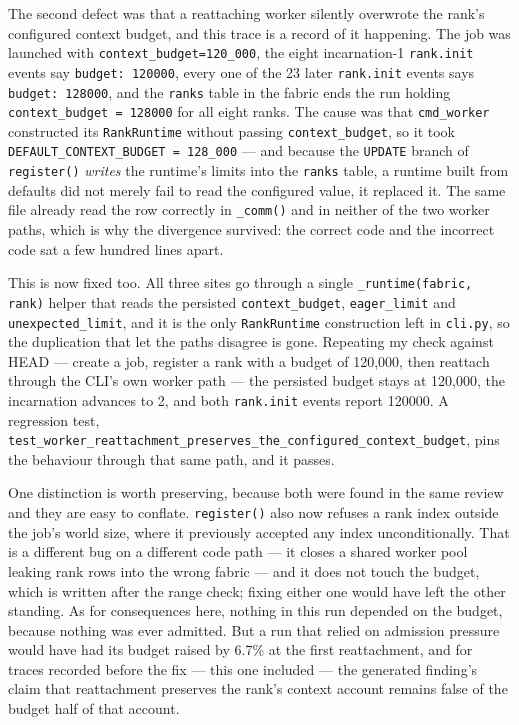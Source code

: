\documentclass[11pt]{article}
\begin{document}
The second defect was that a reattaching worker silently overwrote the rank's configured context
budget, and this trace is a record of it happening. The job was launched with
\texttt{context\_budget=120\_000}, the eight incarnation-1 \texttt{rank.init} events say
\texttt{budget: 120000}, every one of the 23 later \texttt{rank.init} events says
\texttt{budget: 128000}, and the \texttt{ranks} table in the fabric ends the run holding
\texttt{context\_budget = 128000} for all eight ranks. The cause was that \texttt{cmd\_worker}
constructed its \texttt{RankRuntime} without passing \texttt{context\_budget}, so it took
\texttt{DEFAULT\_CONTEXT\_BUDGET = 128\_000} --- and because the \texttt{UPDATE} branch of
\texttt{register()} \emph{writes} the runtime's limits into the \texttt{ranks} table, a runtime
built from defaults did not merely fail to read the configured value, it replaced it. The same
file already read the row correctly in \texttt{\_comm()} and in neither of the two worker paths,
which is why the divergence survived: the correct code and the incorrect code sat a few hundred
lines apart.

This is now fixed too. All three sites go through a single \texttt{\_runtime(fabric, rank)} helper
that reads the persisted \texttt{context\_budget}, \texttt{eager\_limit} and
\texttt{unexpected\_limit}, and it is the only \texttt{RankRuntime} construction left in
\texttt{cli.py}, so the duplication that let the paths disagree is gone. Repeating my check
against HEAD --- create a job, register a rank with a budget of 120{,}000, then reattach through
the CLI's own worker path --- the persisted budget stays at 120{,}000, the incarnation advances
to 2, and both \texttt{rank.init} events report 120000. A regression test,
\texttt{test\_worker\_reattachment\_preserves\_the\_configured\_context\_budget}, pins the
behaviour through that same path, and it passes.

One distinction is worth preserving, because both were found in the same review and they are easy
to conflate. \texttt{register()} also now refuses a rank index outside the job's world size, where
it previously accepted any index unconditionally. That is a different bug on a different code
path --- it closes a shared worker pool leaking rank rows into the wrong fabric --- and it does
not touch the budget, which is written after the range check; fixing either one would have left
the other standing. As for consequences here, nothing in this run depended on the budget, because
nothing was ever admitted. But a run that relied on admission pressure would have had its budget
raised by 6.7\% at the first reattachment, and for traces recorded before the fix --- this one
included --- the generated finding's claim that reattachment preserves the rank's context account
remains false of the budget half of that account.
\end{document}
